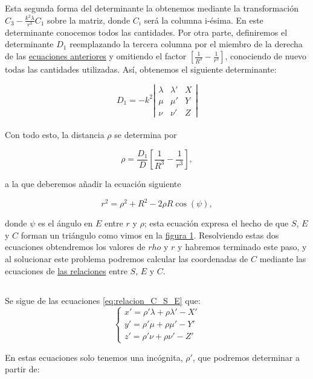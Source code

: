 \documentclass[11pt]{article}
\begin{document}
Esta segunda forma del determinante la obtenemos mediante la transformación $C_3-\frac{k^2\lambda}{r^3}C_1$ sobre la matriz, donde $C_i$ será la columna i-ésima. En este determinante conocemos todos las cantidades. Por otra parte, definiremos el determinante $D_1$ reemplazando la tercera columna por el miembro de la derecha de las \hyperref[eq:fin_paso_1]{ecuaciones anteriores} y omitiendo el factor $[\frac{1}{R^3}-\frac{1}{r^3}]$, conociendo de nuevo todas las cantidades utilizadas. Así, obtenemos el siguiente determinante:

\[
D_1 = -k^2
\left|
\begin{array}{ccc}
\lambda & \lambda' & X\\
\mu & \mu' & Y\\
\nu & \nu' & Z
\end{array}
\right|
\]\\

Con todo esto, la distancia $\rho$ se determina por

\[
\rho = \frac{D_1}{D}[\frac{1}{R^3}-\frac{1}{r^3}],
\]

\noindent a la que deberemos añadir la ecuación siguiente

\[
r^2=\rho^2+R^2-2\rho R\cos(\psi),
\]

donde $\psi$ es el ángulo en $E$ entre $r$ y $\rho$; esta ecuación expresa el hecho de que $S$, $E$ y $C$ forman un triángulo como vimos en la \hyperref[figure:1]{figura 1}. Resolviendo estas dos ecuaciones obtendremos los valores de $rho$ y $r$ y habremos terminado este paso, y al solucionar este problema podremos calcular las coordenadas de $C$ mediante las ecuaciones de \hyperref[eq:relacion_C_S_E]{las relaciones} entre $S$, $E$ y $C$.\\

\subsection{}
Se sigue de las ecuaciones \ref{eq:relacion_C_S_E} que:
\[
\left\{
\begin{array}{l}
	x'=\rho'\lambda+\rho\lambda'-X'\\
	y'=\rho'\mu+\rho\mu'-Y'\\
	z'=\rho'\nu+\rho\nu'-Z'
\end{array}
\right.	
\]

En estas ecuaciones solo tenemos una incógnita, $\rho'$, que podremos determinar a partir de:
\end{document}

